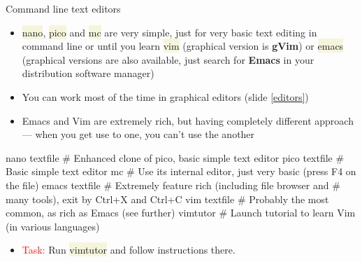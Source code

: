 \documentclass[compress, xelatex, 11pt, xcolor=svgnames, aspectratio=169,
	hyperref={
		bookmarks=true,
		unicode=true,
		colorlinks=true,
		pdftitle={Linux, command line and MetaCentrum},
		plainpages=false,
		pdfauthor={Vojtech Zeisek},
		pdfsubject={Course about use of Linux command line, writing shell scripts and using MetaCentrum of CESNET},
		pdfcreator={XeLaTeX},
		pdfkeywords={Linux, GNU, BASH, shell, command line, MetaCentrum},
		linkcolor=DarkRed, %
		anchorcolor=DarkBlue, %
		citecolor=Indigo, %
		filecolor=NavyBlue, %
		menucolor=DarkMagenta, %
		urlcolor=DarkBlue, %
		},
	url={hyphens, lowtilde} %
	]{beamer}
\renewcommand{\texttt}[1]{\colorbox{Beige}{{\ttfamily #1}}}
\renewcommand{\alert}[1]{\textcolor{red}{#1}}
\begin{document}
\begin{frame}[fragile]{Command line text editors}
	\begin{itemize}
		\item \texttt{nano}, \texttt{pico} and \texttt{mc} are very simple, just for very basic text editing in command line or until you learn \texttt{vim} (graphical version is \textbf{gVim}) or \texttt{emacs} (graphical versions are also available, just search for \textbf{Emacs} in your distribution software manager)
		\item You can work most of the time in graphical editors (slide \ref{editors})
		\item Emacs and Vim are extremely rich, but having completely different approach --- when you get use to one, you can't use the another
	\end{itemize}
	\vfill
	\begin{bashcode}
    nano textfile # Enhanced clone of pico, basic simple text editor
    pico textfile # Basic simple text editor
    mc # Use its internal editor, just very basic (press F4 on the file)
    emacs textfile # Extremely feature rich (including file browser and
                   # many tools), exit by Ctrl+X and Ctrl+C
    vim textfile # Probably the most common, as rich as Emacs (see further)
    vimtutor # Launch tutorial to learn Vim (in various languages)
	\end{bashcode}
	\vfill
	\begin{itemize}
		\item \alert{Task:} Run \texttt{vimtutor} and follow instructions there.
	\end{itemize}
\end{frame}
\end{document}
